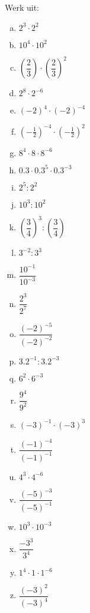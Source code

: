 \documentclass[12pt,twoside]{article}
\begin{document}
\begin{oefening}
Werk uit:
\begin{multicols}{4}
  \begin{enumerate}[(a)]
    \item $2^3\cdot 2^2$
    \item $10^4\cdot 10^2$
    \item $\left(\dfrac{2}{3}\right)\cdot \left(\dfrac{2}{3}\right)^2$
    \item $2^8\cdot 2^{-6}$
    \item $\left(-2\right)^4\cdot \left(-2\right)^{-4}$
    \item $\left(-\frac{1}{2}\right)^{-4}\cdot \left(-\frac{1}{2}\right)^2$
    \item $8^4\cdot 8\cdot 8^{-6}$
    \item $0.3\cdot 0.3^5\cdot 0.3^{-3}$
    \item $2^5: 2^2$
    \item $10^3: 10^2$
    \item $\left(\dfrac{3}{4}\right)^3: \left(\dfrac{3}{4}\right)$
    \item $3^{-2}: 3^3$
    \item $\dfrac{10^{-1}}{10^{-3}}$
    \item $\dfrac{2^{3}}{2^{7}}$
    \item $\dfrac{(-2)^{-5}}{(-2)^{-2}}$
    \item $3.2^{-1}:3.2^{-3}$
    \item $6^2\cdot 6^{-3}$
    \item $\dfrac{9^4}{9^2}$
    \item $\left(-3\right)^{-1}\cdot \left(-3\right)^3$
    \item $\dfrac{\left(-1\right)^{-4}}{\left(-1\right)^{-1}}$
    \item $4^3\cdot 4^{-6}$
    \item $\dfrac{\left(-5\right)^{-3}}{\left(-5\right)^{-1}}$
    \item $10^3\cdot 10^{-3}$
    \item $\dfrac{-3^3}{3^4}$
    \item $1^4\cdot1\cdot1^{-6}$
    \item $\dfrac{\left(-3\right)^{2}}{\left(-3\right)^{4}}$
  \end{enumerate}
\end{multicols}
\end{oefening}
\end{document}
